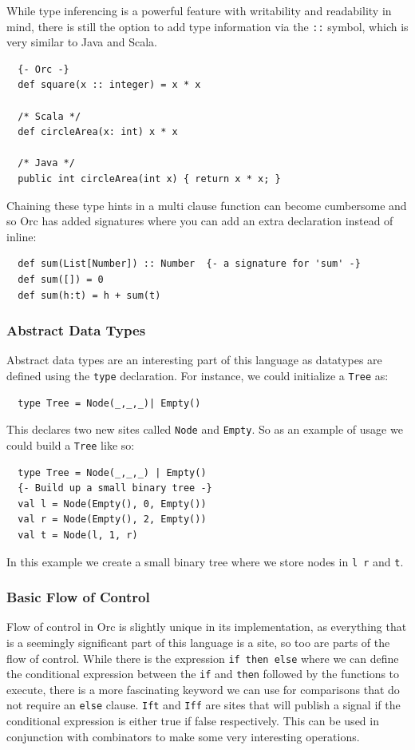 \documentclass[12pt, letterpaper]{article}
\begin{document}
While type inferencing is a powerful feature with writability and readability in mind, there is still the option to add type information via the \texttt{::} symbol, which is very similar to Java and Scala.

\begin{lstlisting}
  {- Orc -}
  def square(x :: integer) = x * x

  /* Scala */
  def circleArea(x: int) x * x

  /* Java */
  public int circleArea(int x) { return x * x; }
\end{lstlisting}

Chaining these type hints in a multi clause function can become cumbersome and so Orc has added signatures where you can add an extra declaration instead of inline:

\begin{lstlisting}
  def sum(List[Number]) :: Number  {- a signature for 'sum' -}
  def sum([]) = 0
  def sum(h:t) = h + sum(t)
\end{lstlisting}

\subsubsection{Abstract Data Types}

Abstract data types are an interesting part of this language as datatypes are defined using the \texttt{type} declaration.  For instance, we could initialize a \texttt{Tree} as:
\begin{lstlisting}
  type Tree = Node(_,_,_)| Empty()
\end{lstlisting}
This declares two new sites called \texttt{Node} and \texttt{Empty}.  So as an example of usage we could build a \texttt{Tree} like so:
\begin{lstlisting}
  type Tree = Node(_,_,_) | Empty()
  {- Build up a small binary tree -}
  val l = Node(Empty(), 0, Empty())
  val r = Node(Empty(), 2, Empty())
  val t = Node(l, 1, r)
\end{lstlisting}
In this example we create a small binary tree where we store nodes in \texttt{l r} and \texttt{t}.

\subsubsection{Basic Flow of Control}

Flow of control in Orc is slightly unique in its implementation, as everything that is a seemingly significant part of this language is a site, so too are parts of the flow of control.   While there is the expression \texttt{if then else} where we can define the conditional expression between the \texttt{if} and \texttt{then} followed by the functions to execute, there is a more fascinating keyword we can use for comparisons that do not require an \texttt{else} clause.  \texttt{Ift} and \texttt{Iff} are sites that will publish a signal if the conditional expression is either true if false respectively.  This can be used in conjunction with combinators to make some very interesting operations.
\end{document}
